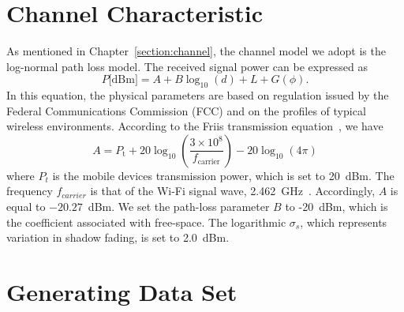 \section{Channel Characteristic}

As mentioned in Chapter~\ref{section:channel}, the channel model we adopt is the log-normal path loss model.
The received signal power can be expressed as
\begin{equation} \label{equation:Power}
P \text{[dBm]}
= A + B \log_{10}(d) + L + G (\phi) .
\end{equation}
In this equation, the physical parameters are based on regulation issued by the Federal Communications Commission (FCC) and on the profiles of typical wireless environments.
According to the Friis transmission equation~\cite{friis1946note}, we have
\begin{equation*}
A = P_{\mathrm{t}} + 20 \log_{10} \left( \frac{3 \times 10^8}{f_{\mathrm{carrier}}} \right) - 20\log_{10}(4\pi) 
\end{equation*}
where $P_{t}$ is the mobile devices transmission power, which is set to 20~dBm.
The frequency $f_{carrier}$ is that of the Wi-Fi signal wave, 2.462~GHz~\cite{goldsmith2005wireless}.
Accordingly, $A$ is equal to $-20.27$~dBm.
We set the path-loss parameter $B$ to -20~dBm, which is the coefficient associated with free-space.
The logarithmic $\sigma_{s}$, which represents variation in shadow fading, is set to 2.0~dBm.


\section{Generating Data Set}

